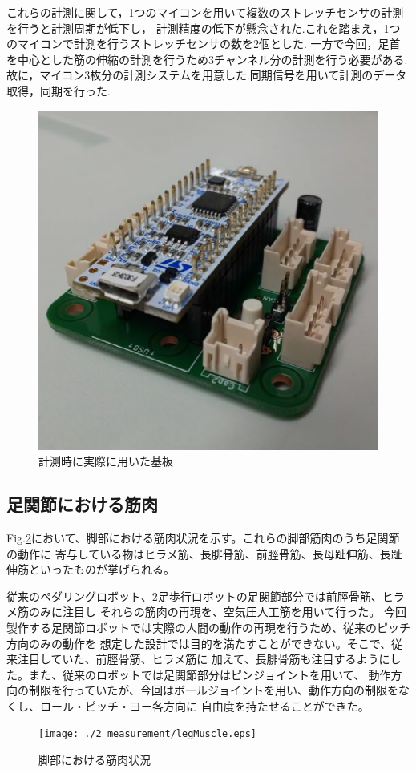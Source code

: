 これらの計測に関して，1つのマイコンを用いて複数のストレッチセンサの計測を行うと計測周期が低下し，
計測精度の低下が懸念された.これを踏まえ，1つのマイコンで計測を行うストレッチセンサの数を2個とした.
一方で今回，足首を中心とした筋の伸縮の計測を行うため3チャンネル分の計測を行う必要がある.
故に，マイコン3枚分の計測システムを用意した.同期信号を用いて計測のデータ取得，同期を行った.
\begin{figure}[h]
 \begin{center}
  \includegraphics[width=0.5\columnwidth,clip]{./2_measurement/circuit.eps}
  \caption{計測時に実際に用いた基板}
  \label{fig:circuit}
 \end{center}
\end{figure}

\newpage

\subsection{足関節における筋肉}
Fig.\ref{fig:legMuscle}において、脚部における筋肉状況を示す。これらの脚部筋肉のうち足関節の動作に
寄与している物はヒラメ筋、長腓骨筋、前脛骨筋、長母趾伸筋、長趾伸筋といったものが挙げられる。

従来のペダリングロボット、2足歩行ロボットの足関節部分では前脛骨筋、ヒラメ筋のみに注目し
それらの筋肉の再現を、空気圧人工筋を用いて行った。
今回製作する足関節ロボットでは実際の人間の動作の再現を行うため、従来のピッチ方向のみの動作を
想定した設計では目的を満たすことができない。そこで、従来注目していた、前脛骨筋、ヒラメ筋に
加えて、長腓骨筋も注目するようにした。また、従来のロボットでは足関節部分はピンジョイントを用いて、
動作方向の制限を行っていたが、今回はボールジョイントを用い、動作方向の制限をなくし、ロール・ピッチ・ヨー各方向に
自由度を持たせることができた。
\begin{figure}[h]
    \begin{center}
     \texttt{[image: ./2\_measurement/legMuscle.eps]}
     \caption{脚部における筋肉状況}
     \label{fig:legMuscle}
    \end{center}
\end{figure}


